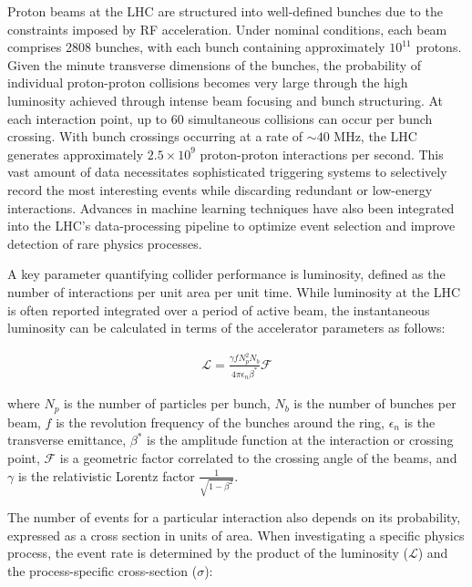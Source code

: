 Proton beams at the LHC are structured into well-defined bunches due to the constraints imposed by RF acceleration. Under nominal conditions, each beam comprises 2808 bunches, with each bunch containing approximately $10^{11}$ protons. Given the minute transverse dimensions of the bunches, the probability of individual proton-proton collisions becomes very large through the high luminosity achieved through intense beam focusing and bunch structuring. At each interaction point, up to 60 simultaneous collisions can occur per bunch crossing. With bunch crossings occurring at a rate of $\sim40$ MHz, the LHC generates approximately $2.5 \times 10^9$ proton-proton interactions per second. This vast amount of data necessitates sophisticated triggering systems to selectively record the most interesting events while discarding redundant or low-energy interactions. Advances in machine learning techniques have also been integrated into the LHC's data-processing pipeline to optimize event selection and improve detection of rare physics processes.

A key parameter quantifying collider performance is luminosity, defined as the number of interactions per unit area per unit time. While luminosity at the LHC is often reported integrated over a period of active beam, the instantaneous luminosity can be calculated in terms of the accelerator parameters as follows:

\begin{equation}
\label{eq:lumi}
\begin{gathered}
\mathcal{L} = \frac{\gamma f N_p^2 N_b}{4 \pi \epsilon_n \beta^*} \mathcal{F}
\end{gathered}
\end{equation}

where $N_p$ is the number of particles per bunch, $N_b$ is the number of bunches per beam, $f$ is the revolution frequency of the bunches around the ring, $\epsilon_n$ is the transverse emittance, $\beta^*$ is the amplitude function at the interaction or crossing point, $\mathcal{F}$ is a geometric factor correlated to the crossing angle of the beams, and $\gamma$ is the relativistic Lorentz factor $\frac{1}{\sqrt{1-\beta^2}}$.

The number of events for a particular interaction also depends on its probability, expressed as a cross section in units of area. When investigating a specific physics process, the event rate is determined by the product of the luminosity ($\mathcal{L}$) and the process-specific cross-section ($\sigma$):

